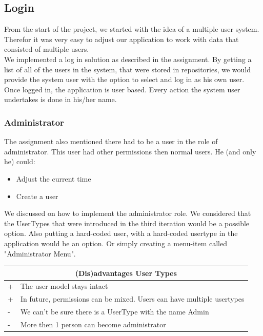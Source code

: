 			
		
		
		\subsection{Login}
			From the start of the project, we started with the idea of a multiple user system. Therefor it was very easy to adjust our application to work with data that consisted of multiple users.\\
			We implemented a log in solution as described in the assignment. By getting a list of all of the users in the system, that were stored in repositories, we would provide the system user with the option to select and log in as his own user.\\
			Once logged in, the application is user based. Every action the system user undertakes is done in his/her name.
			\subsubsection{Administrator}
			The assignment also mentioned there had to be a user in the role of administrator. This user had other permissions then normal users. He (and only he) could:
			\begin{itemize}
				\item{Adjust the current time}
				\item{Create a user}
			\end{itemize}
			
			We discussed on how to implement the administrator role. We considered that the UserTypes that were introduced in the third iteration would be a possible option. Also putting a hard-coded user, with a hard-coded usertype in the application would be an option. Or simply creating a menu-item called "Administrator Menu".\\
			\begin{tabular}{|l|l|}
				\hline
				\multicolumn{2}{|c|}{(Dis)advantages User Types} \\
				\hline
				+ & The user model stays intact\\
				+ & In future, permissions can be mixed. Users can have multiple usertypes\\
				\hline
				- & We can't be sure there is a UserType with the name Admin\\
				- & More then 1 person can become administrator\\
				\hline
			\end{tabular}
			
